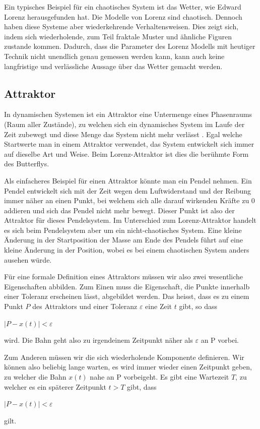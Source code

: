 Ein typisches Beispiel für ein chaotisches System ist das Wetter, wie Edward Lorenz herausgefunden hat. Die Modelle von Lorenz sind chaotisch. Dennoch haben diese Systeme aber	 wiederkehrende Verhaltensweisen. Dies zeigt sich, indem sich wiederholende, zum Teil fraktale Muster und ähnliche Figuren zustande kommen. Dadurch, dass die Parameter des Lorenz Modells mit heutiger Technik nicht unendlich genau gemessen werden kann, kann auch keine langfristige und verlässliche Aussage über das Wetter gemacht werden. 

\subsection{Attraktor}
In dynamischen Systemen ist ein Attraktor eine Untermenge eines Phasenraums (Raum aller Zustände), zu welchen sich ein dynamisches System im Laufe der Zeit zubewegt und diese Menge das System nicht mehr verlässt \cite{wikiattraktor}. 
Egal welche Startwerte man in einem Attraktor verwendet, das System entwickelt sich immer auf dieselbe Art und Weise. Beim Lorenz-Attraktor ist dies die berühmte Form des Butterflys. 

Als einfacheres Beispiel für einen Attraktor könnte man ein Pendel nehmen. Ein Pendel entwickelt sich mit der Zeit wegen dem Luftwiderstand und der Reibung immer näher an einen Punkt, bei welchem sich alle darauf wirkenden Kräfte zu 0 addieren und sich das Pendel nicht mehr bewegt. Dieser Punkt ist also der Attraktor für dieses Pendelsystem. Im Unterschied zum Lorenz-Attraktor handelt es sich beim Pendelsystem aber um ein nicht-chaotisches System. Eine kleine Änderung in der Startposition der Masse am Ende des Pendels führt auf eine kleine Änderung in der Position, wobei es bei einem chaotischen System anders ausehen würde. 

Für eine formale Definition eines Attraktors müssen wir also zwei wesentliche Eigenschaften abbilden. Zum Einen muss die Eigenschaft, die Punkte innerhalb einer Toleranz erscheinen lässt, abgebildet werden. Das heisst, dass es zu einem Punkt $P$ des Attraktors  und einer Toleranz $\varepsilon$ eine Zeit $t$ gibt, so dass 

\begin{center}
	$|P - x(t)| < \varepsilon$
\end{center}
wird. Die Bahn geht also zu irgendeinem Zeitpunkt näher als $\varepsilon$ an P vorbei.

Zum Anderen müssen wir die sich wiederholende Komponente definieren. Wir können also beliebig lange warten, es wird immer wieder einen Zeitpunkt geben, zu welcher die Bahn $x(t)$ nahe an P vorbeigeht. Es gibt eine Wartezeit $T$, zu welcher es ein späterer Zeitpunkt $t > T$ gibt, dass
\begin{center}
	$|P - x(t) |< \varepsilon$
\end{center}
gilt.


